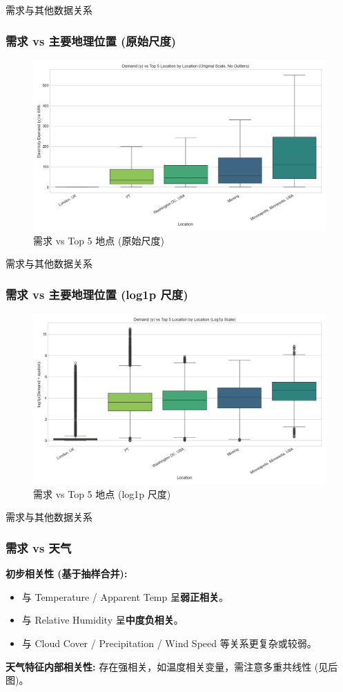 \documentclass{beamer} %
\begin{document}
\begin{frame}{需求与其他数据关系}
    \frametitle{需求 vs 主要地理位置 (原始尺度)}
    \begin{figure}
        \centering
        \includegraphics[width=\textwidth]{../plots/demand_vs_top5_location_boxplot_orig.png}
        \caption{需求 vs Top 5 地点 (原始尺度)}
    \end{figure}
\end{frame}

\begin{frame}{需求与其他数据关系}
    \frametitle{需求 vs 主要地理位置 (log1p 尺度)}
    \begin{figure}
        \centering
        \includegraphics[width=\textwidth]{../plots/demand_vs_top5_location_boxplot_log1p.png}
        \caption{需求 vs Top 5 地点 (log1p 尺度)}
    \end{figure}
\end{frame}

\begin{frame}{需求与其他数据关系}
    \frametitle{需求 vs 天气}
    \textbf{初步相关性 (基于抽样合并):}
    \begin{itemize}
        \item 与 Temperature / Apparent Temp 呈\textbf{弱正相关}。
        \item 与 Relative Humidity 呈\textbf{中度负相关}。
        \item 与 Cloud Cover / Precipitation / Wind Speed 等关系更复杂或较弱。
    \end{itemize}
    \textbf{天气特征内部相关性:} 存在强相关，如温度相关变量，需注意多重共线性 (见后图)。
\end{frame}
\end{document}
